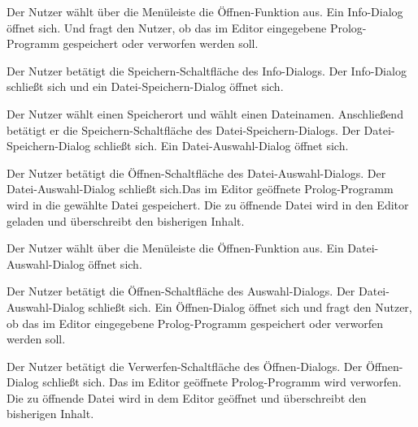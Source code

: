 \documentclass[parskip=full,11pt,twoside]{scrartcl}
\begin{document}
{Der Nutzer wählt über die Menüleiste die Öffnen-Funktion aus.}
{Ein Info-Dialog öffnet sich. Und fragt den Nutzer, ob das im Editor eingegebene Prolog-Programm gespeichert oder verworfen werden soll.}

{Der Nutzer betätigt die Speichern-Schaltfläche des Info-Dialogs.}
{Der Info-Dialog schließt sich und ein Datei-Speichern-Dialog öffnet sich.}

{Der Nutzer wählt einen Speicherort und wählt einen Dateinamen. Anschließend betätigt er die Speichern-Schaltfläche des Datei-Speichern-Dialogs.}
{Der Datei-Speichern-Dialog schließt sich. Ein Datei-Auswahl-Dialog öffnet sich.}

{Der Nutzer betätigt die Öffnen-Schaltfläche des Datei-Auswahl-Dialogs.}
{Der Datei-Auswahl-Dialog schließt sich.Das im Editor geöffnete Prolog-Programm wird in die gewählte Datei gespeichert. Die zu öffnende Datei wird in den Editor geladen und überschreibt den bisherigen Inhalt.}


{Der Nutzer wählt über die Menüleiste die Öffnen-Funktion aus.}
{Ein Datei-Auswahl-Dialog öffnet sich.}

{Der Nutzer betätigt die Öffnen-Schaltfläche des Auswahl-Dialogs.}
{Der Datei-Auswahl-Dialog schließt sich. Ein Öffnen-Dialog öffnet sich und fragt den Nutzer, ob das im Editor eingegebene Prolog-Programm gespeichert oder verworfen werden soll.}

{Der Nutzer betätigt die Verwerfen-Schaltfläche des Öffnen-Dialogs.}
{Der Öffnen-Dialog schließt sich. Das im Editor geöffnete Prolog-Programm wird verworfen. Die zu öffnende Datei wird in dem Editor geöffnet und überschreibt den bisherigen Inhalt.}

\end{document}
